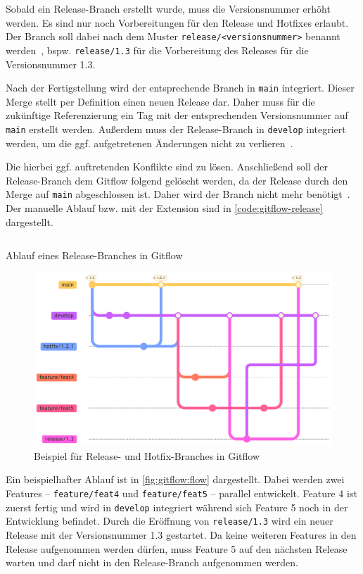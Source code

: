 Sobald ein Release\hyp Branch erstellt wurde, muss die Versionsnummer erhöht werden. Es sind nur noch Vorbereitungen für den Release und Hotfixes erlaubt. Der Branch soll dabei nach dem Muster \texttt{release/<versionsnummer>} benannt werden~\cite{driessenSuccessfulGitBranching2010}, bspw. \texttt{release/1.3} für die Vorbereitung des Releases für die Versionsnummer 1.3.

Nach der Fertigstellung wird der entsprechende Branch in \texttt{main} integriert. Dieser Merge stellt per Definition einen neuen Release dar. Daher muss für die zukünftige Referenzierung ein Tag mit der entsprechenden Versionsnummer auf \texttt{main} erstellt werden. Außerdem muss der Release-Branch in \texttt{develop} integriert werden, um die ggf. aufgetretenen Änderungen nicht zu verlieren~\cite{driessenSuccessfulGitBranching2010}.

Die hierbei ggf. auftretenden Konflikte sind zu lösen. Anschließend soll der Release-Branch dem Gitflow folgend gelöscht werden, da der Release durch den Merge auf \texttt{main} abgeschlossen ist. Daher wird der Branch nicht mehr benötigt~\cite{driessenSuccessfulGitBranching2010}. Der manuelle Ablauf bzw. mit der Extension sind in \autoref{code:gitflow-release} dargestellt.

\begin{listing}
    \inputminted[breaklines]{shell}{src/assets/code/gitflow/gitflow_release.sh}
    \caption{Ablauf eines Release\hyp Branches in Gitflow}
    \label{code:gitflow-release}
\end{listing}

\begin{figure}
    \includegraphics[width=0.7\linewidth]{src/assets/diagrams/gitflow/flow.pdf}
    \caption{Beispiel für Release- und Hotfix\hyp Branches in Gitflow}
    \label{fig:gitflow:flow}
    \Description{}
\end{figure}

Ein beispielhafter Ablauf ist in \autoref{fig:gitflow:flow} dargestellt. Dabei werden zwei Features -- \texttt{feature/feat4} und \texttt{feature/feat5} -- parallel entwickelt. Feature 4 ist zuerst fertig und wird in \texttt{develop} integriert während sich Feature 5 noch in der Entwicklung befindet. Durch die Eröffnung von \texttt{release/1.3} wird ein neuer Release mit der Versionsnummer 1.3 gestartet. Da keine weiteren Features in den Release aufgenommen werden dürfen, muss Feature 5 auf den nächsten Release warten und darf nicht in den Release\hyp Branch aufgenommen werden.

